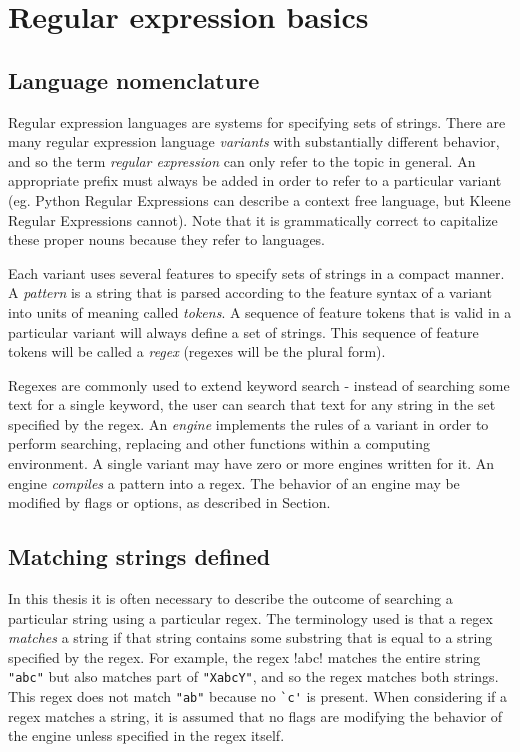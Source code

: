 \section{Regular expression basics}

\subsection{Language nomenclature}
Regular expression languages are systems for specifying sets of strings.  There are many regular expression language \emph{variants} with substantially different behavior, and so the term \emph{regular expression} can only refer to the topic in general.  An appropriate prefix must always be added in order to refer to a particular variant (eg. Python Regular Expressions can describe a context free language, but Kleene Regular Expressions cannot).  Note that it is grammatically correct to capitalize these proper nouns because they refer to languages.

Each variant uses several features to specify sets of strings in a compact manner.  A \emph{pattern} is a string that is parsed according to the feature syntax of a variant into units of meaning called \emph{tokens}.  A sequence of feature tokens that is valid in a particular variant will always define a set of strings.  This sequence of feature tokens will be called a \emph{regex} (regexes will be the plural form).

Regexes are commonly used to extend keyword search - instead of searching some text for a single keyword, the user can search that text for any string in the set specified by the regex.   An \emph{engine} implements the rules of a variant in order to perform searching, replacing and other functions within a computing environment.  A single variant may have zero or more engines written for it.  An engine \emph{compiles} a pattern into a regex.  The behavior of an engine may be modified by flags or options, as described in Section.

\subsection{Matching strings defined}
In this thesis it is often necessary to describe the outcome of searching a particular string using a particular regex.  The terminology used is that a regex \emph{matches} a string if that string contains some substring that is equal to a string specified by the regex.  For example, the regex \cverb!abc! matches the entire string \verb!"abc"! but also matches part of \verb!"XabcY"!, and so the regex matches both strings.  This regex does not match \verb!"ab"! because no \verb!`c'! is present.  When considering if a regex matches a string, it is assumed that no flags are modifying the behavior of the engine unless specified in the regex itself.

